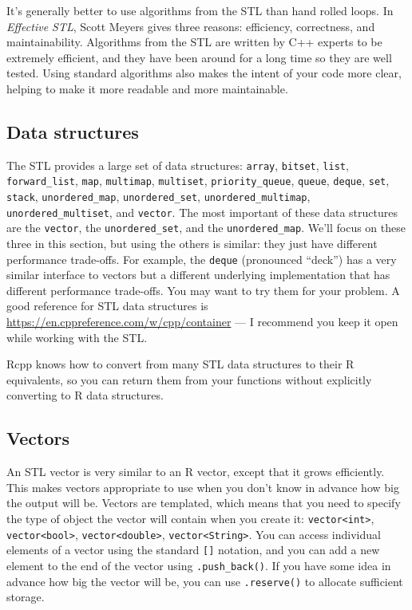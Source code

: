 \documentclass[]{book}
\begin{document}
It's generally better to use algorithms from the STL than hand rolled loops. In \emph{Effective STL}, Scott Meyers gives three reasons: efficiency, correctness, and maintainability. Algorithms from the STL are written by C++ experts to be extremely efficient, and they have been around for a long time so they are well tested. Using standard algorithms also makes the intent of your code more clear, helping to make it more readable and more maintainable.

\hypertarget{data-structures-rcpp}{%
\subsection{Data structures}\label{data-structures-rcpp}}

The STL provides a large set of data structures: \texttt{array}, \texttt{bitset}, \texttt{list}, \texttt{forward\_list}, \texttt{map}, \texttt{multimap}, \texttt{multiset}, \texttt{priority\_queue}, \texttt{queue}, \texttt{deque}, \texttt{set}, \texttt{stack}, \texttt{unordered\_map}, \texttt{unordered\_set}, \texttt{unordered\_multimap}, \texttt{unordered\_multiset}, and \texttt{vector}. The most important of these data structures are the \texttt{vector}, the \texttt{unordered\_set}, and the \texttt{unordered\_map}. We'll focus on these three in this section, but using the others is similar: they just have different performance trade-offs. For example, the \texttt{deque} (pronounced ``deck'') has a very similar interface to vectors but a different underlying implementation that has different performance trade-offs. You may want to try them for your problem. A good reference for STL data structures is \url{https://en.cppreference.com/w/cpp/container} --- I recommend you keep it open while working with the STL.

Rcpp knows how to convert from many STL data structures to their R equivalents, so you can return them from your functions without explicitly converting to R data structures.

\hypertarget{vectors-stl}{%
\subsection{Vectors}\label{vectors-stl}}

An STL vector is very similar to an R vector, except that it grows efficiently. This makes vectors appropriate to use when you don't know in advance how big the output will be. Vectors are templated, which means that you need to specify the type of object the vector will contain when you create it: \texttt{vector\textless{}int\textgreater{}}, \texttt{vector\textless{}bool\textgreater{}}, \texttt{vector\textless{}double\textgreater{}}, \texttt{vector\textless{}String\textgreater{}}. You can access individual elements of a vector using the standard \texttt{{[}{]}} notation, and you can add a new element to the end of the vector using \texttt{.push\_back()}. If you have some idea in advance how big the vector will be, you can use \texttt{.reserve()} to allocate sufficient storage. 
\end{document}
